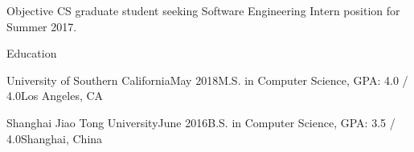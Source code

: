 \documentclass{resume} %
\begin{document}

\begin{rSection}{Objective}
CS graduate student seeking Software Engineering Intern position for Summer 2017.
\end{rSection}


\begin{rSection}{Education}

\begin{rEducation}{University of Southern California}{May 2018}{M.S. in Computer Science, GPA: 4.0 / 4.0}{Los Angeles, CA}
\end{rEducation}

\begin{rEducation}{Shanghai Jiao Tong University}{June 2016}{B.S. in Computer Science, GPA: 3.5 / 4.0}{Shanghai, China}
\end{rEducation}

\end{rSection}

\end{document}
